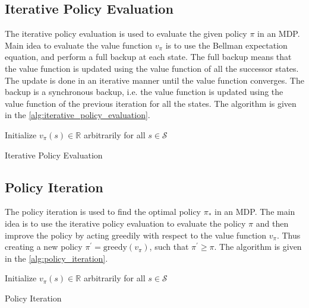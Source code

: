 \subsection{Iterative Policy Evaluation}
The iterative policy evaluation is used to evaluate the given policy \(\pi\) in an MDP. 
Main idea to evaluate the value function \(v_{\pi}\) is to use the Bellman expectation equation,
and perform a full backup at each state. The full backup means that the value function is updated
using the value function of all the successor states. The update is done in an iterative manner
until the value function converges. The backup is a synchronous backup, i.e. the value function
is updated using the value function of the previous iteration for all the states. The algorithm
is given in the \autoref{alg:iterative_policy_evaluation}.


\begin{algorithm}[H]
    \SetAlgoLined
    Initialize \(v_{\pi}(s) \in \mathbb{R}\) arbitrarily for all \(s \in \mathcal{S}\) \;
    \caption{Iterative Policy Evaluation}
    \label{alg:iterative_policy_evaluation}
\end{algorithm}

\subsection{Policy Iteration}
The policy iteration is used to find the optimal policy \(\pi_{*}\) in an MDP. The main idea
is to use the iterative policy evaluation to evaluate the policy \(\pi\) and then improve the policy
by acting greedily with respect to the value function \(v_{\pi}\). Thus creating a new policy
\(\pi^{\prime}  = \text{greedy}(v_{\pi})\), such that \(\pi^{\prime} \geq \pi  \).  The algorithm is given in the \autoref{alg:policy_iteration}.


\begin{algorithm}[H]
    \SetAlgoLined
    Initialize \(v_{\pi}(s) \in \mathbb{R}\) arbitrarily for all \(s \in \mathcal{S}\) \;
    \caption{Policy Iteration}
    \label{alg:policy_iteration}
\end{algorithm}

